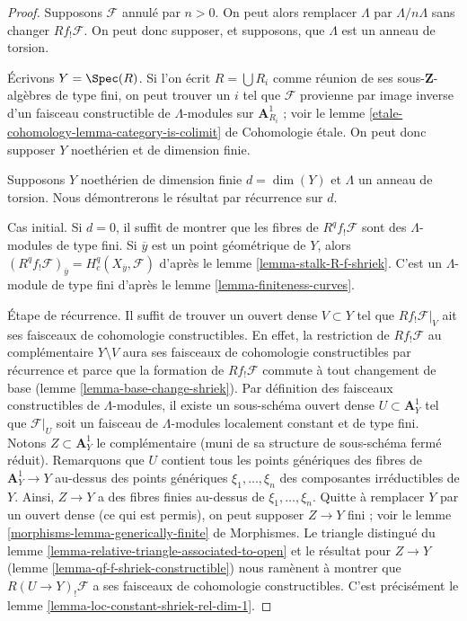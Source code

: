\begin{proof}
Supposons $\mathcal{F}$ annulé par $n > 0$. On peut alors remplacer
$\Lambda$ par $\Lambda/n\Lambda$ sans changer $Rf_!\mathcal{F}$.
On peut donc supposer, et supposons, que $\Lambda$ est un anneau de torsion.

\medskip\noindent
Écrivons $Y = \Spec(R)$. Si l'on écrit
$R = \bigcup R_i$ comme réunion de ses sous-$\mathbf{Z}$-algèbres de type fini,
on peut trouver un $i$ tel que $\mathcal{F}$ provienne par image inverse
d'un faisceau constructible de $\Lambda$-modules sur $\mathbf{A}^1_{R_i}$ ; voir le
lemme \ref{etale-cohomology-lemma-category-is-colimit} de Cohomologie étale.
On peut donc supposer $Y$ noethérien et de dimension finie.

\medskip\noindent
Supposons $Y$ noethérien de dimension finie $d = \dim(Y)$
et $\Lambda$ un anneau de torsion. Nous démontrerons le résultat par récurrence sur $d$.

\medskip\noindent
Cas initial. Si $d = 0$, il suffit de montrer que les fibres
de $R^qf_!\mathcal{F}$ sont des $\Lambda$-modules de type fini.
Si $\overline{y}$ est un point géométrique de $Y$, alors
$(R^qf_!\mathcal{F})_{\overline{y}} = H^q_c(X_{\overline{y}}, \mathcal{F})$
d'après le lemme \ref{lemma-stalk-R-f-shriek}.
C'est un $\Lambda$-module de type fini d'après le lemme \ref{lemma-finiteness-curves}.

\medskip\noindent
Étape de récurrence. Il suffit de trouver un ouvert dense $V \subset Y$ tel
que $Rf_!\mathcal{F}|_V$ ait ses faisceaux de cohomologie constructibles. En effet, la
restriction de $Rf_!\mathcal{F}$ au complémentaire $Y \setminus V$
aura ses faisceaux de cohomologie constructibles par récurrence
et parce que la formation de $Rf_!\mathcal{F}$ commute
à tout changement de base (lemme \ref{lemma-base-change-shriek}).
Par définition des faisceaux constructibles de $\Lambda$-modules, il existe un
sous-schéma ouvert dense $U \subset \mathbf{A}^1_Y$ tel que $\mathcal{F}|_U$
soit un faisceau de $\Lambda$-modules localement constant et de type fini.
Notons $Z \subset \mathbf{A}^1_Y$ le complémentaire (muni de sa structure de
sous-schéma fermé réduit). Remarquons que $U$ contient tous les points génériques des
fibres de $\mathbf{A}^1_Y \to Y$ au-dessus des points génériques
$\xi_1, \ldots, \xi_n$ des composantes irréductibles de $Y$.
Ainsi, $Z \to Y$ a des fibres finies au-dessus de $\xi_1, \ldots, \xi_n$.
Quitte à remplacer $Y$ par un ouvert dense (ce qui est permis), on peut
supposer $Z \to Y$ fini ; voir le
lemme \ref{morphisms-lemma-generically-finite} de Morphismes.
Le triangle distingué du
lemme \ref{lemma-relative-triangle-associated-to-open}
et le résultat pour $Z \to Y$ (lemme \ref{lemma-qf-f-shriek-constructible})
nous ramènent à montrer que
$R(U \to Y)_!\mathcal{F}$ a ses faisceaux de cohomologie constructibles.
C'est précisément le lemme \ref{lemma-loc-constant-shriek-rel-dim-1}.
\end{proof}

